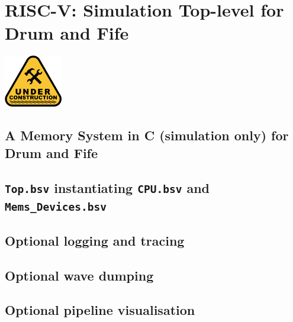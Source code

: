 

\chapter{RISC-V: Simulation Top-level for Drum and Fife}


\setcounter{page}{1}
\renewcommand{\thepage}{\arabic{chapter}-\arabic{page}}

\label{ch_Drum_Top}


\vspace{2ex}

\centerline{\includegraphics[width=1in,angle=0]{Figures/Fig_Under_Construction}}

\vspace{2ex}


\section{A Memory System in C (simulation only) for Drum and Fife}

\section{{\tt Top.bsv} instantiating {\tt CPU.bsv} and {\tt Mems\_Devices.bsv}}

\section{Optional logging and tracing}

\section{Optional wave dumping}

\section{Optional pipeline visualisation}

